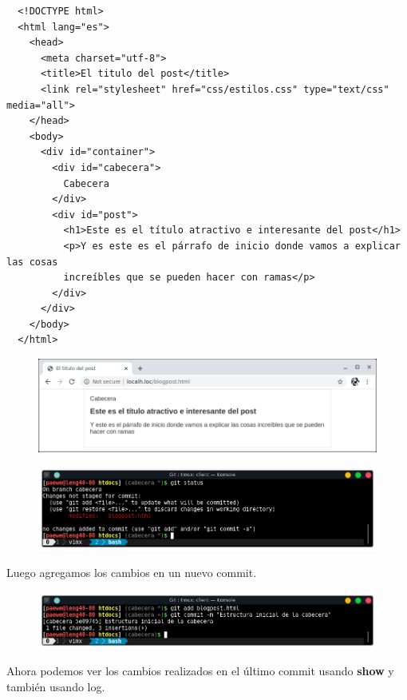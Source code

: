 \documentclass{article}
\begin{document}
\begin{verbatim}
  <!DOCTYPE html>
  <html lang="es">
    <head>
      <meta charset="utf-8">
      <title>El titulo del post</title>
      <link rel="stylesheet" href="css/estilos.css" type="text/css" media="all">
    </head>
    <body>
      <div id="container">
        <div id="cabecera">
          Cabecera
        </div>
        <div id="post">
          <h1>Este es el título atractivo e interesante del post</h1>
          <p>Y es este es el párrafo de inicio donde vamos a explicar las cosas
          increíbles que se pueden hacer con ramas</p>
        </div>
      </div>
    </body>
  </html>
\end{verbatim}

\begin{figure}[h!]
  \centering
  \includegraphics[scale=0.75]{./Pictures/138_cabecera.png}
\end{figure}

\begin{figure}[h!]
  \centering
  \includegraphics[scale=0.75]{./Pictures/139_status.png}
\end{figure}

Luego agregamos los cambios en un nuevo commit.

\begin{figure}[h!]
  \centering
  \includegraphics[scale=0.75]{./Pictures/140_commit.png}
\end{figure}


Ahora podemos ver los cambios realizados en el último commit usando
\textbf{show} y también usando log.
\end{document}

